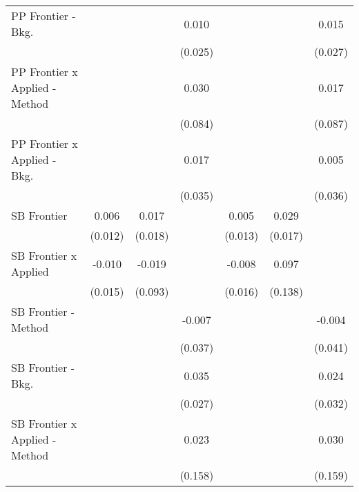 \begin{tabular}{lcccccc}
   PP Frontier - Bkg.             &              &               & 0.010         &              &              & 0.015\\   
                                  &              &               & (0.025)       &              &              & (0.027)\\   
   PP Frontier x Applied - Method &              &               & 0.030         &              &              & 0.017\\   
                                  &              &               & (0.084)       &              &              & (0.087)\\   
   PP Frontier x Applied - Bkg.   &              &               & 0.017         &              &              & 0.005\\   
                                  &              &               & (0.035)       &              &              & (0.036)\\   
   SB Frontier                    & 0.006        & 0.017         &               & 0.005        & 0.029        &   \\   
                                  & (0.012)      & (0.018)       &               & (0.013)      & (0.017)      &   \\   
   SB Frontier x Applied          & -0.010       & -0.019        &               & -0.008       & 0.097        &   \\   
                                  & (0.015)      & (0.093)       &               & (0.016)      & (0.138)      &   \\   
   SB Frontier - Method           &              &               & -0.007        &              &              & -0.004\\   
                                  &              &               & (0.037)       &              &              & (0.041)\\   
   SB Frontier - Bkg.             &              &               & 0.035         &              &              & 0.024\\   
                                  &              &               & (0.027)       &              &              & (0.032)\\   
   SB Frontier x Applied - Method &              &               & 0.023         &              &              & 0.030\\   
                                  &              &               & (0.158)       &              &              & (0.159)\\   

\end{tabular}
